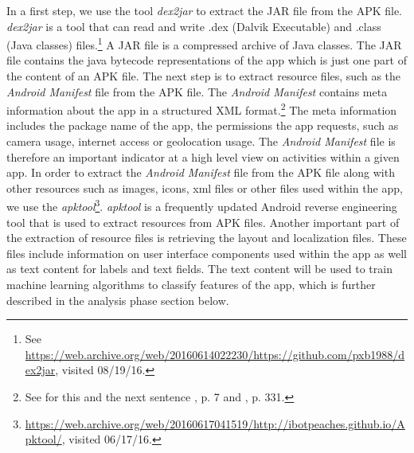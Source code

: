 In a first step, we use the tool \textit{dex2jar} to extract the \acs{JAR} file from the APK file.
\textit{dex2jar} is a tool that can read and write .dex (Dalvik Executable) and .class (Java classes) files.\footnote{See \url{https://web.archive.org/web/20160614022230/https://github.com/pxb1988/dex2jar}, visited 08/19/16.}
A JAR file is a compressed archive of Java classes.
The JAR file contains the java bytecode representations of the app which is just one part of the content of an \acs{APK} file.
The next step is to extract resource files, such as the \textit{Android Manifest} file from the APK file.
The \textit{Android Manifest} contains meta information about the app in a structured XML format.\footnote{See for this and the next sentence \cite{xu2013}, p. 7 and \cite{Shabtai2010}, p. 331.}
The meta information includes the package name of the app, the permissions the app requests, such as camera usage, internet access or geolocation usage.
The \textit{Android Manifest} file is therefore an important indicator at a high level view on activities within a given app.
In order to extract the \textit{Android Manifest} file from the APK file along with other resources such as images, icons, xml files or other files used within the app, we use the \textit{apktool}\footnote{\url{https://web.archive.org/web/20160617041519/http://ibotpeaches.github.io/Apktool/}, visited 06/17/16.}.
\textit{apktool} is a frequently updated Android reverse engineering tool that is used to extract resources from APK files.
Another important part of the extraction of resource files is retrieving the layout and localization files.
These files include information on user interface components used within the app as well as text content for labels and text fields.
The text content will be used to train machine learning algorithms to classify features of the app, which is further described in the analysis phase section below.

